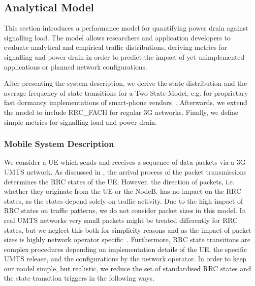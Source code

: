 \subsection{Analytical Model}\label{sec:network:performance_model:analytical_model}
This section introduces a performance model for quantifying power drain against signalling load.
The model allows researchers and application developers to evaluate analytical and empirical traffic distributions, deriving metrics for signalling and power drain in order to predict the impact of yet unimplemented applications or planned network configurations.

After presenting the system description, we derive the state distribution and the average frequency of state transitions for a Two State Model, e.g. for proprietary fast dormancy implementations of smart-phone vendors~\cite{NSN2011}.
Afterwards, we extend the model to include \gls{RRC_FACH} for regular \gls{3G} networks.
Finally, we define simple metrics for signalling load and power drain.

\newcommand{\PacketIAT}{A\xspace}

\subsubsection*{Mobile  System Description}\label{sec:network:performance_model:analytical_model:system_description}
We consider a \gls{UE} which sends and receives a sequence of data packets via a \gls{3G} \gls{UMTS} network.
As discussed in , the arrival process of the packet transmissions determines the \gls{RRC} states of the \gls{UE}.
However, the direction of packets, i.e. whether they originate from the \gls{UE} or the NodeB, has no impact on the \gls{RRC} states, as the states depend solely on traffic activity.
Due to the high impact of \gls{RRC} states on traffic patterns, we do not consider packet sizes in this model.
In real \gls{UMTS} networks very small packets might be treated differently for \gls{RRC} states, but we neglect this both for simplicity reasons and as the impact of packet sizes is highly network operator specific~\cite{Qian2010a}.
Furthermore, \gls{RRC} state transitions are complex procedures depending on implementation details of the \gls{UE}, the specific \gls{UMTS} release, and the configurations by the network operator.
In order to keep our model simple, but realistic, we reduce the set of standardised \gls{RRC} states and the state transition triggers in the following ways.

